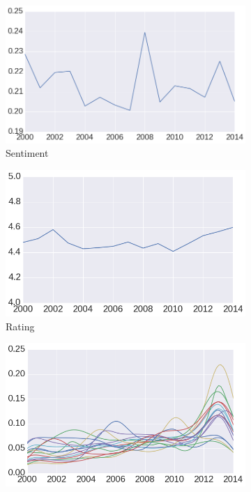 \begin{figure}[ht!]
    \centering
    \begin{subfigure}{.32\textwidth}
        \centering
        \includegraphics[width=.9\linewidth]{ch05_musicology_pics/all_average.png}
        \caption{Sentiment}
        \label{fig:musicology:avgSentReview}
    \end{subfigure}
    \begin{subfigure}{.32\textwidth}
        \centering
        \includegraphics[width=.9\linewidth]{ch05_musicology_pics/avg_score.png}
        \caption{Rating}
        \label{fig:musicology:avgRatingReview}
    \end{subfigure}
    \begin{subfigure}{.32\textwidth}
        \centering
        \includegraphics[width=.9\columnwidth]{ch05_musicology_pics/kde.png}

\end{subfigure}
\end{figure}
